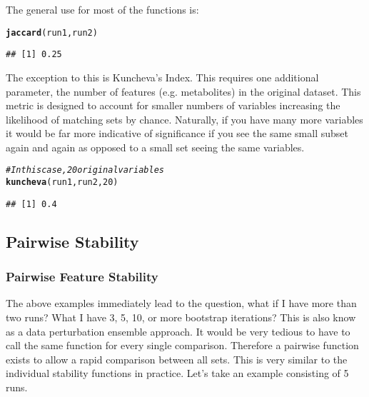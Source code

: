 \documentclass[12pt]{article}\usepackage[]{graphicx}\usepackage[usenames,dvipsnames]{color}
\makeatletter
\newcommand{\hlnum}[1]{\textcolor[rgb]{0.686,0.059,0.569}{#1}}%
\newcommand{\hlcom}[1]{\textcolor[rgb]{0.678,0.584,0.686}{\textit{#1}}}%
\newcommand{\hlstd}[1]{\textcolor[rgb]{0.345,0.345,0.345}{#1}}%
\newcommand{\hlkwd}[1]{\textcolor[rgb]{0.737,0.353,0.396}{\textbf{#1}}}%
\newenvironment{kframe}{%
 \def\at@end@of@kframe{}%
 \ifinner\ifhmode%
  \def\at@end@of@kframe{\end{minipage}}%
  \begin{minipage}{\columnwidth}%
 \fi\fi%
 \def\FrameCommand##1{\hskip\@totalleftmargin \hskip-\fboxsep
 \colorbox{shadecolor}{##1}\hskip-\fboxsep
     \hskip-\linewidth \hskip-\@totalleftmargin \hskip\columnwidth}%
 \MakeFramed {\advance\hsize-\width
   \@totalleftmargin\z@ \linewidth\hsize
   \@setminipage}}%
 {\par\unskip\endMakeFramed%
 \at@end@of@kframe}
\newenvironment{knitrout}{}{} %
\makeatother
\begin{document}
The general use for most of the functions is:

\begin{knitrout}
\color{fgcolor}\begin{kframe}
\begin{alltt}
\hlkwd{jaccard}\hlstd{(run1, run2)}
\end{alltt}
\begin{verbatim}
## [1] 0.25
\end{verbatim}
\end{kframe}
\end{knitrout}

The exception to this is Kuncheva's Index.  This requires one additional
parameter, the number of features (e.g. metabolites) in the original dataset.
This metric is designed to account for smaller numbers of variables increasing
the likelihood of matching sets by chance.  Naturally, if you have many more
variables it would be far more indicative of significance if you see the same
small subset again and again as opposed to a small set seeing the same 
variables.

\begin{knitrout}
\color{fgcolor}\begin{kframe}
\begin{alltt}
\hlcom{# In this case, 20 original variables}
\hlkwd{kuncheva}\hlstd{(run1, run2,} \hlnum{20}\hlstd{)}
\end{alltt}
\begin{verbatim}
## [1] 0.4
\end{verbatim}
\end{kframe}
\end{knitrout}

\newpage
\subsection{Pairwise Stability}
\subsubsection{Pairwise Feature Stability}

The above examples immediately lead to the question, what if I have more than
two runs?  What I have 3, 5, 10, or more bootstrap iterations?  This is also
know as a data perturbation ensemble approach.  It would be  very tedious to 
have to call the same function for every single comparison.  Therefore a 
pairwise function exists to allow a rapid comparison between all sets.  
This  is very similar to the individual 
stability functions in practice.  Let's take an example consisting of 5 runs.
\end{document}
